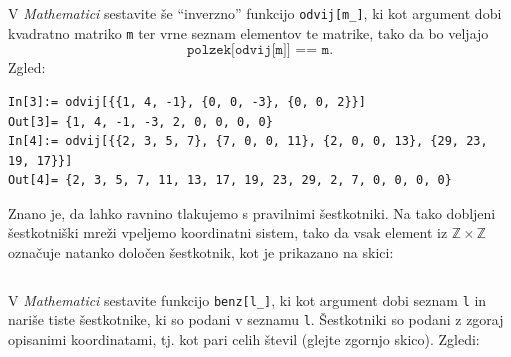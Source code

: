 \documentclass[arhiv]{../izpit}
\begin{document}
\podnaloga[10 točk]
V \emph{Mathematici} sestavite še ``inverzno'' funkcijo \texttt{odvij[m\_]}, ki kot argument dobi kvadratno matriko \texttt{m} ter vrne seznam elementov te matrike, tako da bo veljajo $$\texttt{polzek[odvij[m]] == m}.$$ Zgled:
%
\begin{verbatim}
In[3]:= odvij[{{1, 4, -1}, {0, 0, -3}, {0, 0, 2}}]
Out[3]= {1, 4, -1, -3, 2, 0, 0, 0, 0}
In[4]:= odvij[{{2, 3, 5, 7}, {7, 0, 0, 11}, {2, 0, 0, 13}, {29, 23, 19, 17}}]
Out[4]= {2, 3, 5, 7, 11, 13, 17, 19, 23, 29, 2, 7, 0, 0, 0, 0}
\end{verbatim}


Znano je, da lahko ravnino tlakujemo s pravilnimi šestkotniki. Na tako dobljeni šestkotniški mreži vpeljemo koordinatni sistem, tako da vsak element iz $\mathbb{Z} \times \mathbb{Z}$ označuje natanko določen šestkotnik, kot je prikazano na skici:

$$

$$

\noindent V \emph{Mathematici} sestavite funkcijo \texttt{benz[l\_]}, ki kot argument dobi seznam \texttt{l} in nariše tiste šest\-kot\-nike, ki so podani v seznamu \texttt{l}. Šestkotniki so podani z zgoraj opisanimi koordinatami, tj. kot pari celih števil (glejte zgornjo skico). Zgledi:

\vspace{\baselineskip}
\end{document}
